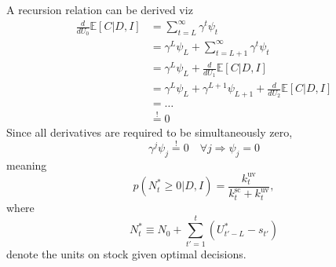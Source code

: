 A recursion relation can be derived viz
\begin{equation}
	\begin{split}
		\frac{d}{dU_0}\mathbb{E}[C|D,I] & = \sum_{t=L}^{\infty}\gamma^{t}\psi_t\\
		& =\gamma^{L}\psi_L+\sum_{t=L+1}^{\infty}\gamma^{t}\psi_t\\
		& =\gamma^{L}\psi_L+\frac{d}{dU_1}\mathbb{E}[C|D,I]\\
		& =\gamma^{L}\psi_L+\gamma^{L+1}\psi_{L+1}+\frac{d}{dU_2}\mathbb{E}[C|D,I]\\
		&=\dots\\
		&\overset{!}{=} 0
	\end{split} 
\end{equation}
Since all derivatives are required to be simultaneously zero,
\begin{equation}
	\gamma^{j}\psi_j\overset{!}{=} 0\quad \forall j \Rightarrow \psi_j=0
\end{equation}
meaning
\begin{equation}
	p(N_t^*\geq 0|D,I)=\frac{k_{t}^\text{uv}}{k^\text{sc}_{t}+k_{t}^\text{uv}},
\end{equation}
where
\begin{equation}
	N_t^*\equiv N_0+\sum_{t'=1}^{t}(U_{t'-L}^*-s_{t'})
\end{equation}
denote the units on stock given optimal decisions.
